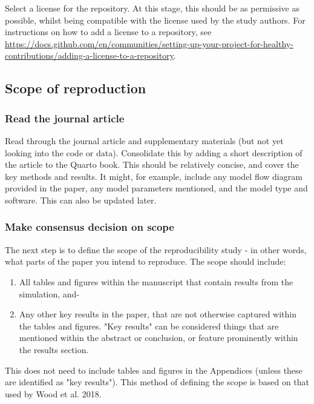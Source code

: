 Select a license for the repository. At this stage, this should be as permissive as possible, whilst being compatible with the license used by the study authors. For instructions on how to add a license to a repository, see \url{https://docs.github.com/en/communities/setting-up-your-project-for-healthy-contributions/adding-a-license-to-a-repository}.

\subsection{Scope of reproduction}

\subsubsection{Read the journal article}
\timeyes

Read through the journal article and supplementary materials (but not yet looking into the code or data). Consolidate this by adding a short description of the article to the Quarto book. This should be relatively concise, and cover the key methods and results. It might, for example, include any model flow diagram provided in the paper, any model parameters mentioned, and the model type and software. This can also be updated later.

\subsubsection{Make consensus decision on scope}

The next step is to define the scope of the reproducibility study - in other words, what parts of the paper you intend to reproduce. The scope should include:
\begin{enumerate}[label=(\alph*)]
    \item All tables and figures within the manuscript that contain results from the simulation, and-
    \item Any other key results in the paper, that are not otherwise captured within the tables and figures. "Key results" can be considered things that are mentioned within the abstract or conclusion, or feature prominently within the results section.
\end{enumerate}

This does not need to include tables and figures in the Appendices (unless these are identified as "key results"). This method of defining the scope is based on that used by Wood et al. 2018.\autocite{wood_replication_2018, wood_push_2018}

